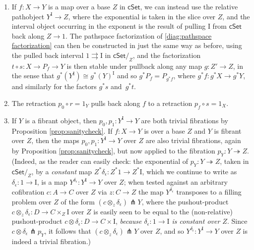 \documentclass[11pt]{amsart}
\newcommand{\cSet}{\ensuremath{\mathsf{cSet}}}
\newcommand{\ra}{\ensuremath{\rightarrow}}
\newcommand{\fib}{\ensuremath{\twoheadrightarrow}}
\renewcommand{\to}{\ensuremath{\rightarrow}}
\newcommand{\I}{\ensuremath{\mathrm{I}}}
\theoremstyle{remark}
\theoremstyle{definition}
\begin{document}
\begin{enumerate}
\item If $f:X\ra Y$ is a map over a base $Z$ in $\cSet$, we can instead use the relative pathobject $Y^\I \to Z$, where the exponential is taken in the slice over $Z$, and the interval object occurring in the exponent is the result of pulling $\I$ from $\cSet$ back along $Z\to 1$.  The pathspace factorization of \eqref{diag:pathspace factorization} can then be constructed in just the same way as before, using the pulled back interval $1\rightrightarrows \I$ in $\cSet/_Z$, and the factorization $t\circ s:X\ra P_f \ra Y$ is then stable under pullback along any map $g : Z' \ra Z$, in the sense that $g^*(Y^\I) \cong g^*(Y)^\I$ and so $g^*P_f = P_{g^*f}$, where $g^*f : g^*X \ra g^* Y$, and similarly for the factors $g^*s$ and~$g^*t$.  

\item The retraction $p_0\circ r = 1_Y$ pulls back along $f$ to a retraction $p_f \circ s =1_X$.

\item If $Y$ is a fibrant object, then $p_0 , p_1 : Y^\I \ra Y$ are both trivial fibrations by Proposition \ref{prop:sanitycheck}.  If $f:X\ra Y$ is over a base $Z$ and $Y$ is fibrant over $Z$, then the maps $p_0 , p_1 : Y^\I \ra Y$ over $Z$ are also trivial fibrations, again by Proposition \ref{prop:sanitycheck}, but now applied to the fibration $p_Y : Y\fib Z$.  (Indeed, as the reader can easily check: the exponential of $p_Y : Y\fib Z$, taken in $\cSet/_Z$, by a \emph{constant} map $Z^*\delta_\epsilon : Z^*1\to Z^*\I$, which we continue to write as $\delta_\epsilon : 1\to \I$, is a map $Y^{\delta_\epsilon} : Y^\I \to Y$ over $Z$; when tested against an arbitrary cofibration $c : A \to C$ over $Z$ via $z : C\to Z$ the map $Y^{\delta_\epsilon}$ transposes to a filling problem over $Z$ of the form $(c \otimes_z \delta_\epsilon) \pitchfork Y$, where the pushout-product $c \otimes_z \delta_\epsilon : D \to C \times_Z \I$  over $Z$ is easily seen to be equal to the (non-relative) pushout-product $c \otimes \delta_\epsilon : D \to C \times \I$, \emph{because $\delta_\epsilon : 1 \to \I$  is constant over $Z$}.  Since $c \otimes \delta_\epsilon \pitchfork p_Y$, it follows that $(c \otimes_z \delta_\epsilon) \pitchfork Y$ over $Z$, and so $Y^{\delta_\epsilon} : Y^\I \to Y$ over $Z$ is indeed a trivial fibration.)


\end{enumerate}
\end{document}
